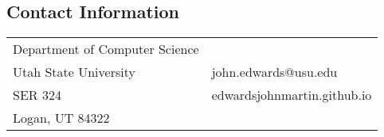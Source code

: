 \documentclass[margin,line]{res}
\begin{document}

\begin{resume}
\section{\sc Contact Information}
\vspace{.05in}


\begin{tabular}{@{}p{3.3in}p{3in}}
Department of Computer Science & \\%
Utah State University   & john.edwards@usu.edu \\
SER 324      &  edwardsjohnmartin.github.io \\
Logan, UT 84322          &
\end{tabular}


\end{resume}
\end{document}
